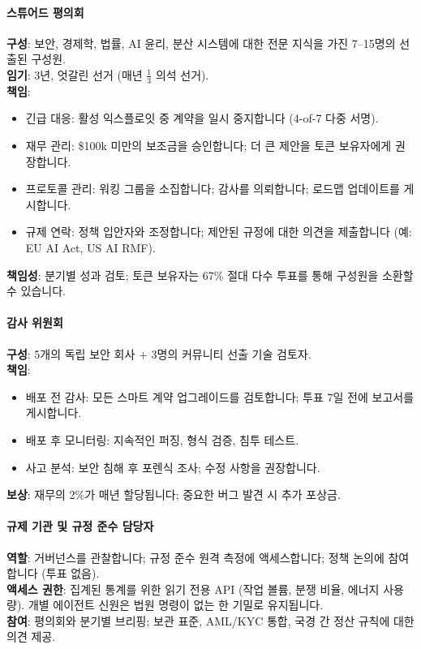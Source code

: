 \documentclass[11pt]{article}
\begin{document}
\paragraph{스튜어드 평의회}
\textbf{구성}: 보안, 경제학, 법률, AI 윤리, 분산 시스템에 대한 전문 지식을 가진 7--15명의 선출된 구성원.\\
\textbf{임기}: 3년, 엇갈린 선거 (매년 $\frac{1}{3}$ 의석 선거).\\
\textbf{책임}:
\begin{itemize}[noitemsep]
  \item 긴급 대응: 활성 익스플로잇 중 계약을 일시 중지합니다 (4-of-7 다중 서명).
  \item 재무 관리: \$100k 미만의 보조금을 승인합니다; 더 큰 제안을 토큰 보유자에게 권장합니다.
  \item 프로토콜 관리: 워킹 그룹을 소집합니다; 감사를 의뢰합니다; 로드맵 업데이트를 게시합니다.
  \item 규제 연락: 정책 입안자와 조정합니다; 제안된 규정에 대한 의견을 제출합니다 (예: EU AI Act, US AI RMF).
\end{itemize}
\textbf{책임성}: 분기별 성과 검토; 토큰 보유자는 67\% 절대 다수 투표를 통해 구성원을 소환할 수 있습니다.

\paragraph{감사 위원회}
\textbf{구성}: 5개의 독립 보안 회사 + 3명의 커뮤니티 선출 기술 검토자.\\
\textbf{책임}:
\begin{itemize}[noitemsep]
  \item 배포 전 감사: 모든 스마트 계약 업그레이드를 검토합니다; 투표 7일 전에 보고서를 게시합니다.
  \item 배포 후 모니터링: 지속적인 퍼징, 형식 검증, 침투 테스트.
  \item 사고 분석: 보안 침해 후 포렌식 조사; 수정 사항을 권장합니다.
\end{itemize}
\textbf{보상}: 재무의 2\%가 매년 할당됩니다; 중요한 버그 발견 시 추가 포상금.

\paragraph{규제 기관 및 규정 준수 담당자}
\textbf{역할}: 거버넌스를 관찰합니다; 규정 준수 원격 측정에 액세스합니다; 정책 논의에 참여합니다 (투표 없음).\\
\textbf{액세스 권한}: 집계된 통계를 위한 읽기 전용 API (작업 볼륨, 분쟁 비율, 에너지 사용량). 개별 에이전트 신원은 법원 명령이 없는 한 기밀로 유지됩니다.\\
\textbf{참여}: 평의회와 분기별 브리핑; 보관 표준, AML/KYC 통합, 국경 간 정산 규칙에 대한 의견 제공.
\end{document}
